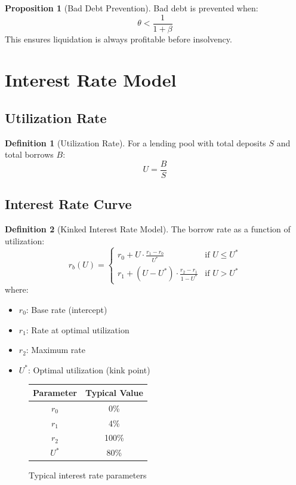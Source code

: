 \documentclass[11pt,a4paper]{article}
\theoremstyle{definition}
\newtheorem{definition}{Definition}
\newtheorem{proposition}{Proposition}
\begin{document}
\begin{proposition}[Bad Debt Prevention]
Bad debt is prevented when:
\begin{equation}
\theta < \frac{1}{1 + \beta}
\end{equation}
This ensures liquidation is always profitable before insolvency.
\end{proposition}

\section{Interest Rate Model}

\subsection{Utilization Rate}

\begin{definition}[Utilization Rate]
For a lending pool with total deposits $S$ and total borrows $B$:
\begin{equation}
U = \frac{B}{S}
\end{equation}
\end{definition}

\subsection{Interest Rate Curve}

\begin{definition}[Kinked Interest Rate Model]
The borrow rate as a function of utilization:
\begin{equation}
r_b(U) = \begin{cases}
r_0 + U \cdot \frac{r_1 - r_0}{U^*} & \text{if } U \leq U^* \\
r_1 + (U - U^*) \cdot \frac{r_2 - r_1}{1 - U^*} & \text{if } U > U^*
\end{cases}
\end{equation}
where:
\begin{itemize}
\item $r_0$: Base rate (intercept)
\item $r_1$: Rate at optimal utilization
\item $r_2$: Maximum rate
\item $U^*$: Optimal utilization (kink point)
\end{itemize}
\end{definition}

\begin{figure}[h]
\centering
\begin{tabular}{|c|c|}
\hline
Parameter & Typical Value \\
\hline
$r_0$ & 0\% \\
$r_1$ & 4\% \\
$r_2$ & 100\% \\
$U^*$ & 80\% \\
\hline
\end{tabular}
\caption{Typical interest rate parameters}
\end{figure}
\end{document}
